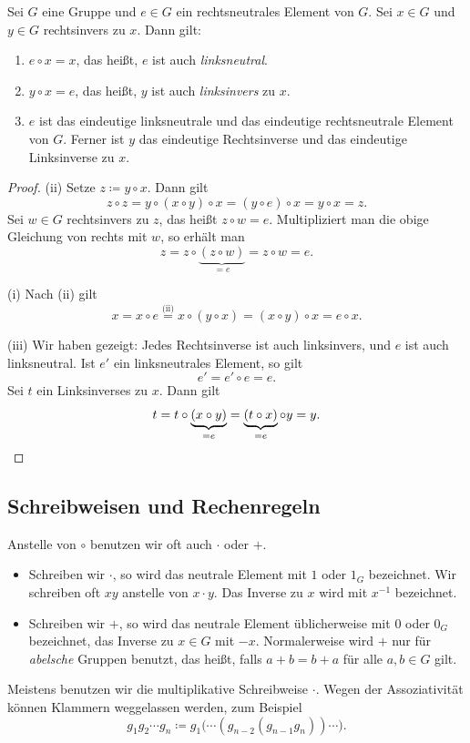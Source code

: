 \documentclass[11pt]{article}
\begin{document}
\begin{lemma}\Theorem
  Sei $G$ eine Gruppe und $e \in G$ ein rechtsneutrales Element von $G$. Sei $x \in G$ und $y \in G$ rechtsinvers zu $x$. Dann gilt:
  \begin{enumerate}[label=(\roman*)]
    \item $e \circ x = x$, das heißt, $e$ ist auch \emph{linksneutral}.
    \item $y \circ x = e$, das heißt, $y$ ist auch \emph{linksinvers} zu $x$.
    \item $e$ ist das eindeutige linksneutrale und das eindeutige rechtsneutrale Element von $G$. Ferner ist $y$ das eindeutige Rechtsinverse und das eindeutige Linksinverse zu $x$.
  \end{enumerate}
\end{lemma}
\begin{proof}
  (ii) Setze $z \coloneqq y \circ x$. Dann gilt
  \[ z \circ z = y \circ (x \circ y) \circ x = (y \circ e) \circ x = y \circ x = z. \]
  Sei $w \in G$ rechtsinvers zu $z$, das heißt $z \circ w = e$.
  Multipliziert man die obige Gleichung von rechts mit $w$, so erhält man
  \[ z = z \circ \underbrace{(z \circ w)}_{= e} = z \circ w = e. \]

  (i) Nach (ii) gilt
  \[ x = x \circ e \overset{\text{(ii)}}{=} x \circ (y \circ x) = (x \circ y) \circ x = e \circ x. \]

  (iii) Wir haben gezeigt: Jedes Rechtsinverse ist auch linksinvers, und $e$ ist auch linksneutral.
  Ist $e'$ ein linksneutrales Element, so gilt
  \[ e' = e' \circ e = e. \]
  Sei $t$ ein Linksinverses zu $x$. Dann gilt
  \[ t = t \circ \underbrace{(x \circ y)}_{= e} = \underbrace{(t \circ x)}_{= e} \circ y = y. \qedhere \]
\end{proof}

\subsection{Schreibweisen und Rechenregeln}

Anstelle von $\circ$ benutzen wir oft auch $\cdot$ oder $+$.
\begin{itemize}
  \item Schreiben wir $\cdot$, so wird das neutrale Element mit $1$ oder $1_G$ bezeichnet. Wir schreiben oft $xy$ anstelle von $x \cdot y$. Das Inverse zu $x$ wird mit $x^{-1}$ bezeichnet.
  \item Schreiben wir $+$, so wird das neutrale Element üblicherweise mit $0$ oder $0_G$ bezeichnet, das Inverse zu $x \in G$ mit $-x$.
    Normalerweise wird $+$ nur für \emph{abelsche} Gruppen benutzt, das heißt, falls $a + b = b + a$ für alle $a, b \in G$ gilt.
\end{itemize}
Meistens benutzen wir die multiplikative Schreibweise $\cdot$. Wegen der Assoziativität können Klammern weggelassen werden, zum Beispiel
\[ g_1 g_2 \dotsm g_n \coloneqq g_1 \bigl( \dotsm (g_{n-2} (g_{n-1} g_n)) \dotsm \bigr). \]
\end{document}
